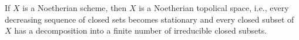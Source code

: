 If $X$ is a Noetherian scheme, then $X$ is a Noetherian topolical space, i.e.,
every decreasing sequence of closed sets becomes stationary and every closed subset
of $X$ has a decomposition into a finite number of irreducible closed subsets.
